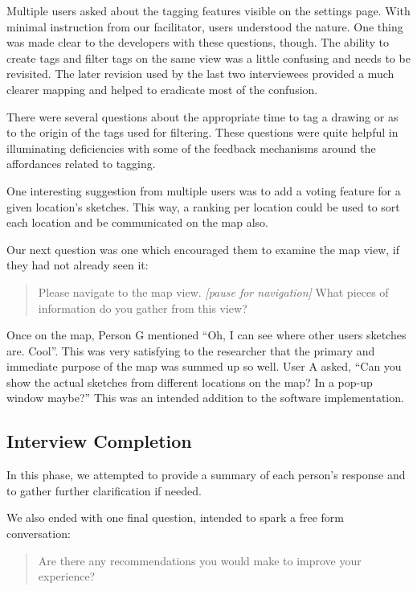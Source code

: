 \documentclass{chi2009}
\begin{document}
Multiple users asked about the tagging features visible on the settings page.
With minimal instruction from our facilitator, users understood the nature.
One thing was made clear to the developers with these questions, though.  The
ability to create tags and filter tags on the same view was a little confusing
and needs to be revisited.  The later revision used by the last two
interviewees provided a much clearer mapping and helped to eradicate most of
the confusion.

There were several questions about the appropriate time to tag a drawing or as
to the origin of the tags used for filtering.  These questions were quite
helpful in illuminating deficiencies with some of the feedback mechanisms
around the affordances related to tagging.

One interesting suggestion from multiple users was to add a voting feature for
a given location's sketches.  This way, a ranking per location could be used to
sort each location and be communicated on the map also.

Our next question was one which encouraged them to examine the map view, if
they had not already seen it:
\begin{quote}
Please navigate to the map view. {\it [pause for navigation]}
What pieces of information do you gather from this view?
\end{quote}

Once on the map, Person G mentioned ``Oh, I can see where other users sketches
are.  Cool''.  This was very satisfying to the researcher that the primary and
immediate purpose of the map was summed up so well.  User A asked, ``Can you
show the actual sketches from different locations on the map? In a pop-up
window maybe?''  This was an intended addition to the software implementation.

\subsection{Interview Completion}

In this phase, we attempted to provide a summary of each person's response and
to gather further clarification if needed.

We also ended with one final question, intended to spark a free form conversation:

\begin{quote}
Are there any recommendations you would make to improve your experience?
\end{quote}
\end{document}
